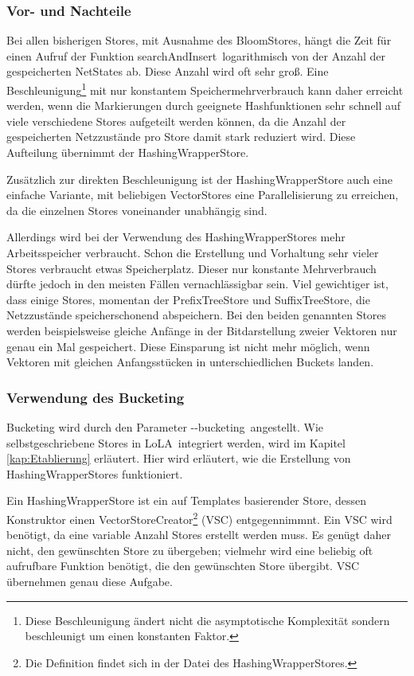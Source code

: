 \documentclass[12pt,a4paper,titlepage]{scrartcl}
\renewcommand \( {\left (}
\renewcommand \) {\right )}
\renewcommand \[ {\left [}
\renewcommand \] {\right ]}
\newcommand \Flqq {\flqq\ }
\newcommand{\lola}{\frqq LoLA\Flqq}
\begin{document}
\subsubsection{Vor- und Nachteile}
Bei allen bisherigen Stores, mit Ausnahme des BloomStores, hängt die Zeit für einen Aufruf der Funktion \frqq searchAndInsert\Flqq logarithmisch von der Anzahl der gespeicherten NetStates ab. Diese Anzahl wird oft sehr groß. Eine Beschleunigung\footnote{Diese Beschleunigung ändert nicht die asymptotische Komplexität sondern beschleunigt um einen konstanten Faktor.} mit nur konstantem Speichermehrverbrauch kann daher erreicht werden, wenn die Markierungen durch geeignete Hashfunktionen sehr schnell auf viele verschiedene Stores aufgeteilt werden können, da die Anzahl der gespeicherten Netzzustände pro Store damit stark reduziert wird. Diese Aufteilung übernimmt der HashingWrapperStore.

Zusätzlich zur direkten Beschleunigung ist der HashingWrapperStore auch eine einfache Variante, mit beliebigen VectorStores eine Parallelisierung zu erreichen, da die einzelnen Stores voneinander unabhängig sind.

Allerdings wird bei der Verwendung des HashingWrapperStores mehr Arbeitsspeicher verbraucht. Schon die Erstellung und Vorhaltung sehr vieler Stores verbraucht etwas Speicherplatz. Dieser nur konstante Mehrverbrauch dürfte jedoch in den meisten Fällen vernachlässigbar sein. Viel gewichtiger ist, dass einige Stores, momentan der PrefixTreeStore und SuffixTreeStore, die Netzzustände speicherschonend abspeichern. Bei den beiden genannten Stores werden beispielsweise gleiche Anfänge in der Bitdarstellung zweier Vektoren nur genau ein Mal gespeichert. Diese Einsparung ist nicht mehr möglich, wenn Vektoren mit gleichen Anfangsstücken in unterschiedlichen Buckets landen.

\subsubsection{Verwendung des Bucketing}
Bucketing wird durch den Parameter \frqq -{}-bucketing\Flqq angestellt. Wie selbstgeschriebene Stores in \lola integriert werden, wird im Kapitel \ref{kap:Etablierung} erläutert. Hier wird erläutert, wie die Erstellung von HashingWrapperStores funktioniert.

Ein HashingWrapperStore ist ein auf Templates basierender Store, dessen Konstruktor einen VectorStoreCreator\footnote{Die Definition findet sich in der Datei des HashingWrapperStores.} (VSC) entgegennimmnt. Ein VSC wird benötigt, da eine variable Anzahl Stores erstellt werden muss. Es genügt daher nicht, den gewünschten Store zu übergeben; vielmehr wird eine beliebig oft aufrufbare Funktion benötigt, die den gewünschten Store übergibt. VSC übernehmen genau diese Aufgabe.
\end{document}
